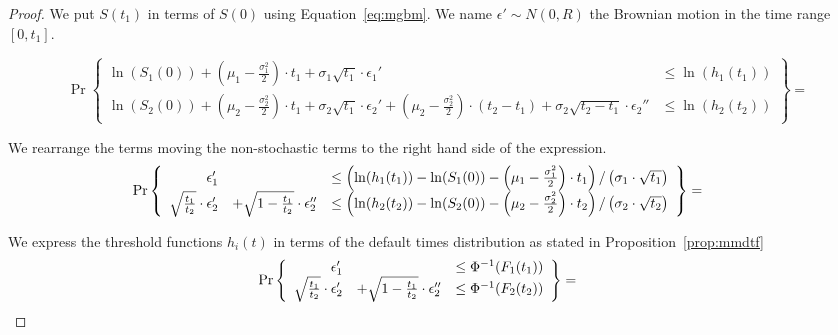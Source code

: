 \documentclass[11pt,fleqn]{book} %
\begin{document}
\begin{proof}
	We put $S(t_1)$ in terms of $S(0)$ using Equation~\ref{eq:mgbm}. We name 
	$\epsilon' \sim N(0,R)$ the Brownian motion in the time range $[0,t_1]$.
	{\small
	\begin{displaymath}
		\Pr\left\{ 
		\begin{array}{ll}
			\ln(S_1(0)) + 
			\left(\mu_1 - \frac{\sigma_1^2}{2}\right) \cdot t_1 + \sigma_1 \sqrt{t_1} \cdot \epsilon_1' 
			& \le \ln(h_1(t_1))
			\\
			\ln(S_2(0)) +
			\left(\mu_2 - \frac{\sigma_2^2}{2}\right) \cdot t_1 + \sigma_2 \sqrt{t_1} \cdot \epsilon_2' +
			\left(\mu_2 - \frac{\sigma_2^2}{2}\right) \cdot (t_2-t_1) + \sigma_2 \sqrt{t_2-t_1} \cdot \epsilon_2'' 
			& \le \ln(h_2(t_2)) 
		\end{array}
		\right\} =
	\end{displaymath}\par}
	
	We rearrange the terms moving the non-stochastic terms to the right	hand 
	side of the expression.
	\begin{displaymath}
		\hspace*{-1cm}
		\Pr\left\{ 
		\begin{array}{rll}
			\epsilon_1' & &
			\le \left(\ln(h_1(t_1)) - \ln(S_1(0)) - \left(\mu_1 - \frac{\sigma_1^2}{2}\right) \cdot t_1\right)/\left(\sigma_1\cdot\sqrt{t_1}\right)
			\\
			\sqrt{\frac{t_1}{t_2}} \cdot \epsilon_2' & + \sqrt{1-\frac{t_1}{t_2}} \cdot \epsilon_2'' & 
			\le \left(\ln(h_2(t_2)) - \ln(S_2(0)) - \left(\mu_2 - \frac{\sigma_2^2}{2}\right) \cdot t_2\right)/\left(\sigma_2\cdot\sqrt{t_2}\right)
		\end{array}
		\right\} =
	\end{displaymath}

	We express the threshold functions $h_i(t)$ in terms of the default times 
	distribution as stated in Proposition~\ref{prop:mmdtf}
	\begin{displaymath}
		\hspace*{-1cm}
		\Pr\left\{ 
		\begin{array}{rll}
			\epsilon_1' & &
			\le \Phi^{-1}(F_1(t_1))
			\\
			\sqrt{\frac{t_1}{t_2}} \cdot \epsilon_2' & + \sqrt{1-\frac{t_1}{t_2}} \cdot \epsilon_2'' & 
			\le \Phi^{-1}(F_2(t_2))
		\end{array}
		\right\} = 
	\end{displaymath}


\end{proof}
\end{document}
